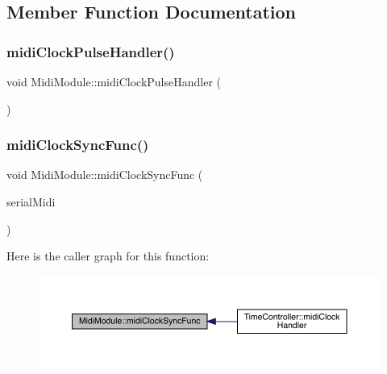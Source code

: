 \subsection{Member Function Documentation}
\mbox{\label{class_midi_module_a1bf6988219b4e272cc9b3c662dcda562}} 
\subsubsection{\texorpdfstring{midi\+Clock\+Pulse\+Handler()}{midiClockPulseHandler()}}
{\footnotesize\ttfamily void Midi\+Module\+::midi\+Clock\+Pulse\+Handler (\begin{DoxyParamCaption}{ }\end{DoxyParamCaption})}

\mbox{\label{class_midi_module_ad056b64f96805ece5c60084663e53340}} 
\subsubsection{\texorpdfstring{midi\+Clock\+Sync\+Func()}{midiClockSyncFunc()}}
{\footnotesize\ttfamily void Midi\+Module\+::midi\+Clock\+Sync\+Func (\begin{DoxyParamCaption}\item[{midi\+::\+Midi\+Interface$<$ Hardware\+Serial $>$ $\ast$}]{serial\+Midi }\end{DoxyParamCaption})}

Here is the caller graph for this function\+:
\nopagebreak
\begin{figure}[H]
\begin{center}
\leavevmode
\includegraphics[width=350pt]{class_midi_module_ad056b64f96805ece5c60084663e53340_icgraph}
\end{center}
\end{figure}
\mbox{\label{class_midi_module_a6aba8f34fbe85384c19d03aed5307acf}} 
